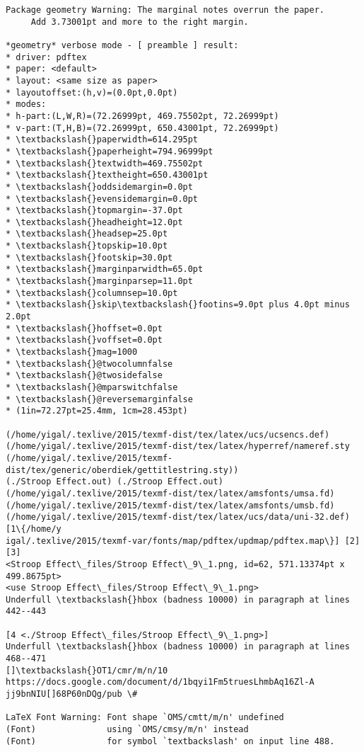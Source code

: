 \documentclass{article}
\begin{document}
\begin{Verbatim}[commandchars=\\\{\}]
Package geometry Warning: The marginal notes overrun the paper.
     Add 3.73001pt and more to the right margin.

*geometry* verbose mode - [ preamble ] result:
* driver: pdftex
* paper: <default>
* layout: <same size as paper>
* layoutoffset:(h,v)=(0.0pt,0.0pt)
* modes: 
* h-part:(L,W,R)=(72.26999pt, 469.75502pt, 72.26999pt)
* v-part:(T,H,B)=(72.26999pt, 650.43001pt, 72.26999pt)
* \textbackslash{}paperwidth=614.295pt
* \textbackslash{}paperheight=794.96999pt
* \textbackslash{}textwidth=469.75502pt
* \textbackslash{}textheight=650.43001pt
* \textbackslash{}oddsidemargin=0.0pt
* \textbackslash{}evensidemargin=0.0pt
* \textbackslash{}topmargin=-37.0pt
* \textbackslash{}headheight=12.0pt
* \textbackslash{}headsep=25.0pt
* \textbackslash{}topskip=10.0pt
* \textbackslash{}footskip=30.0pt
* \textbackslash{}marginparwidth=65.0pt
* \textbackslash{}marginparsep=11.0pt
* \textbackslash{}columnsep=10.0pt
* \textbackslash{}skip\textbackslash{}footins=9.0pt plus 4.0pt minus 2.0pt
* \textbackslash{}hoffset=0.0pt
* \textbackslash{}voffset=0.0pt
* \textbackslash{}mag=1000
* \textbackslash{}@twocolumnfalse
* \textbackslash{}@twosidefalse
* \textbackslash{}@mparswitchfalse
* \textbackslash{}@reversemarginfalse
* (1in=72.27pt=25.4mm, 1cm=28.453pt)

(/home/yigal/.texlive/2015/texmf-dist/tex/latex/ucs/ucsencs.def)
(/home/yigal/.texlive/2015/texmf-dist/tex/latex/hyperref/nameref.sty
(/home/yigal/.texlive/2015/texmf-dist/tex/generic/oberdiek/gettitlestring.sty))
(./Stroop Effect.out) (./Stroop Effect.out)
(/home/yigal/.texlive/2015/texmf-dist/tex/latex/amsfonts/umsa.fd)
(/home/yigal/.texlive/2015/texmf-dist/tex/latex/amsfonts/umsb.fd)
(/home/yigal/.texlive/2015/texmf-dist/tex/latex/ucs/data/uni-32.def) [1\{/home/y
igal/.texlive/2015/texmf-var/fonts/map/pdftex/updmap/pdftex.map\}] [2] [3]
<Stroop Effect\_files/Stroop Effect\_9\_1.png, id=62, 571.13374pt x 499.8675pt>
<use Stroop Effect\_files/Stroop Effect\_9\_1.png>
Underfull \textbackslash{}hbox (badness 10000) in paragraph at lines 442--443

[4 <./Stroop Effect\_files/Stroop Effect\_9\_1.png>]
Underfull \textbackslash{}hbox (badness 10000) in paragraph at lines 468--471
[]\textbackslash{}OT1/cmr/m/n/10 https://docs.google.com/document/d/1bqyi1Fm5truesLhmbAq16Zl-A
jj9bnNIU[]68P60nDQg/pub \#

LaTeX Font Warning: Font shape `OMS/cmtt/m/n' undefined
(Font)              using `OMS/cmsy/m/n' instead
(Font)              for symbol `textbackslash' on input line 488.


\end{Verbatim}
\end{document}

